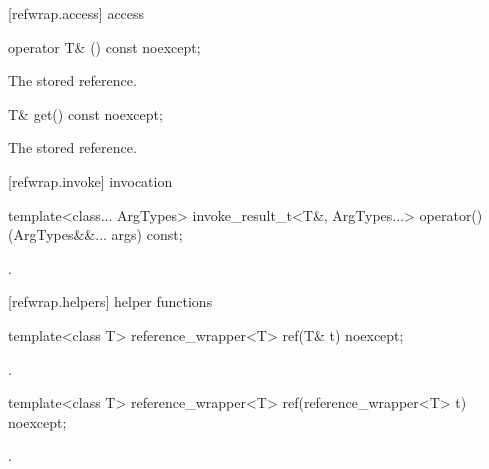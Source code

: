 [refwrap.access]{ access}

%
\begin{itemdecl}
operator T& () const noexcept;
\end{itemdecl}

\begin{itemdescr}
\pnum\returns The stored reference.
\end{itemdescr}

%
\begin{itemdecl}
T& get() const noexcept;
\end{itemdecl}

\begin{itemdescr}
\pnum\returns The stored reference.
\end{itemdescr}


[refwrap.invoke]{ invocation}

%
\begin{itemdecl}
template<class... ArgTypes>
  invoke_result_t<T&, ArgTypes...>
    operator()(ArgTypes&&... args) const;
\end{itemdecl}

\begin{itemdescr}
\pnum\returns {}.
\end{itemdescr}


[refwrap.helpers]{ helper functions}

%
\begin{itemdecl}
template<class T> reference_wrapper<T> ref(T& t) noexcept;
\end{itemdecl}

\begin{itemdescr}
\pnum\returns {}.
\end{itemdescr}

%
\begin{itemdecl}
template<class T> reference_wrapper<T> ref(reference_wrapper<T> t) noexcept;
\end{itemdecl}

\begin{itemdescr}
\pnum\returns {}.
\end{itemdescr}

